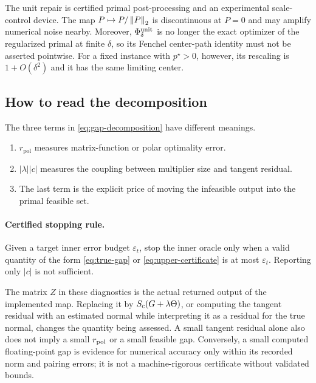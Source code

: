 \begin{boundary}
The unit repair is certified primal post-processing and an experimental
scale-control device.  The map \(P\mapsto P/\left\lVert P\right\rVert_{2}\) is discontinuous at
\(P=0\) and may amplify numerical noise nearby.  Moreover,
\(\Phi_\delta^{\rm unit}\) is no longer the exact optimizer of the
regularized primal at finite \(\delta\), so its Fenchel center-path identity
must not be asserted pointwise.  For a fixed instance with \(p^\star>0\),
however, its rescaling is \(1+O(\delta^2)\)
and it has the same limiting center.
\end{boundary}

\subsection{How to read the decomposition}

The three terms in \eqref{eq:gap-decomposition} have different meanings.

\begin{enumerate}
  \item \(r_{\mathrm{pol}}\) measures matrix-function or polar optimality
        error.
  \item \(|\lambda||c|\) measures the coupling between multiplier size and
        tangent residual.
  \item The last term is the explicit price of moving the infeasible output
        into the primal feasible set.
\end{enumerate}

\paragraph{Certified stopping rule.}
Given a target inner error budget \(\varepsilon_t\), stop the inner oracle only
when a valid quantity of the form \eqref{eq:true-gap} or
\eqref{eq:upper-certificate} is at most \(\varepsilon_t\).  Reporting only
\(|c|\) is not sufficient.

The matrix \(Z\) in these diagnostics is the actual returned output of the
implemented map.  Replacing it by \(S_{\mathrm c}(G+\lambda\Theta)\), or computing
the tangent residual with an estimated normal while interpreting it as a
residual for the true normal, changes the quantity being assessed.  A small
tangent residual alone also does not imply a small \(r_{\rm pol}\) or a
small feasible gap.  Conversely, a small computed floating-point gap is
evidence for numerical accuracy only within its recorded norm and pairing
errors; it is not a machine-rigorous certificate without validated bounds.

